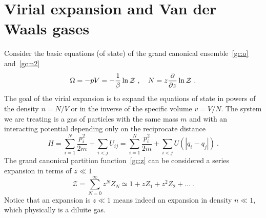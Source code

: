 \section{Virial expansion and Van der Waals gases} 

    Consider the basic equations (of state) of the grand canonical ensemble~\eqref{gc:o} and~\eqref{gc:n2} 
    \begin{equation}\label{gc:es}
        \Omega = - pV = - \frac{1}{\beta} \ln \mathcal Z~, \quad N = z \frac{\partial}{\partial z} \ln \mathcal Z ~.
    \end{equation}
    The goal of the virial expansion is to expand the equations of state in powers of the density $n = N/V$ or in the inverse of the specific volume $v = V / N$. The system we are treating is a gas of particles with the same mass $m$ and with an interacting potential depending only on the reciprocate distance 
    \begin{equation*}
        H = \sum_{i=1}^N \frac{p_i^2}{2m} + \sum_{i < j} U_{ij} = \sum_{i=1}^N \frac{p_i^2}{2m} + \sum_{i < j} U (|q_i - q_j|) ~.
    \end{equation*}
    The grand canonical partition function~\eqref{gc:z} can be considered a series expansion in terms of $z \ll 1$ 
    \begin{equation*}
        \mathcal Z = \sum_{N=0}^\infty z^N Z_N \simeq 1 + z Z_1 + z^2 Z_2 + \ldots ~.
    \end{equation*}
    Notice that an expansion is $z \ll 1$ means indeed an expansion in density $n \ll 1$, which physically is a diluite gas.

